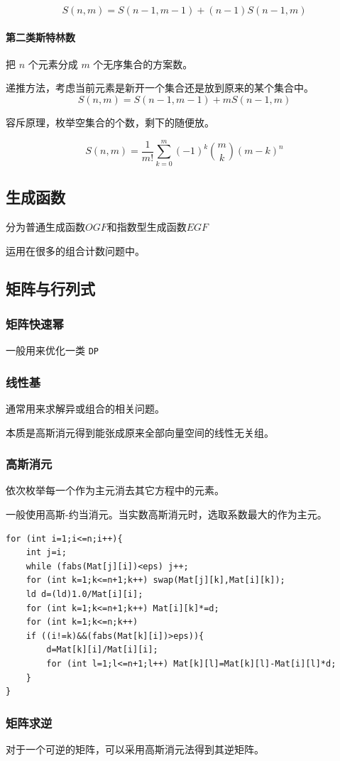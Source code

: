 \documentclass[UTF-8]{ctexart}
\begin{document}
	$$S(n,m)=S(n-1,m-1)+(n-1)S(n-1,m)$$
	\paragraph{第二类斯特林数} 把 $n$ 个元素分成 $m$ 个无序集合的方案数。
	
	递推方法，考虑当前元素是新开一个集合还是放到原来的某个集合中。
	$$S(n,m)=S(n-1,m-1)+mS(n-1,m)$$
	
	容斥原理，枚举空集合的个数，剩下的随便放。
	
	$$S(n,m)={\frac 1 {m!}}\sum_{k=0}^m (-1)^k {m \choose k}(m-k)^n$$
	\subsection{生成函数}
	分为普通生成函数$OGF$和指数型生成函数$EGF$
	
	运用在很多的组合计数问题中。
	\subsection{矩阵与行列式}
	\subsubsection{矩阵快速幂}
	一般用来优化一类 \texttt{DP}
	\subsubsection{线性基}
	通常用来求解异或组合的相关问题。
	
	本质是高斯消元得到能张成原来全部向量空间的线性无关组。
	\subsubsection{高斯消元}
	依次枚举每一个作为主元消去其它方程中的元素。
	
	一般使用高斯-约当消元。当实数高斯消元时，选取系数最大的作为主元。
\begin{verbatim}
for (int i=1;i<=n;i++){
    int j=i;
    while (fabs(Mat[j][i])<eps) j++;
    for (int k=1;k<=n+1;k++) swap(Mat[j][k],Mat[i][k]);
    ld d=(ld)1.0/Mat[i][i];
    for (int k=1;k<=n+1;k++) Mat[i][k]*=d;
    for (int k=1;k<=n;k++)
    if ((i!=k)&&(fabs(Mat[k][i])>eps)){
        d=Mat[k][i]/Mat[i][i];
        for (int l=1;l<=n+1;l++) Mat[k][l]=Mat[k][l]-Mat[i][l]*d;
    }
}
\end{verbatim}
	\subsubsection{矩阵求逆}
	对于一个可逆的矩阵，可以采用高斯消元法得到其逆矩阵。
	
\end{document}
